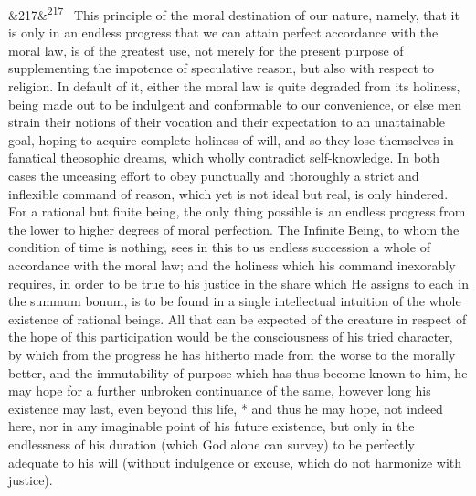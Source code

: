 \documentclass[12pt]{article}
\newcommand{\para}[1][]{\par\noindent\ifx&#1&\else\textsuperscript{\footnotesize #1}~\fi}
\begin{document}
\para[217] This principle of the moral destination of our nature, namely, that it is only in an endless progress that we can attain perfect accordance with the moral law, is of the greatest use, not merely for the present purpose of supplementing the impotence of speculative reason, but also with respect to religion. In default of it, either the moral law is quite degraded from its holiness, being made out to be indulgent and conformable to our convenience, or else men strain their notions of their vocation and their expectation to an unattainable goal, hoping to acquire complete holiness of will, and so they lose themselves in fanatical theosophic dreams, which wholly contradict self-knowledge. In both cases the unceasing effort to obey punctually and thoroughly a strict and inflexible command of reason, which yet is not ideal but real, is only hindered. For a rational but finite being, the only thing possible is an endless progress from the lower to higher degrees of moral perfection. The Infinite Being, to whom the condition of time is nothing, sees in this to us endless succession a whole of accordance with the moral law; and the holiness which his command inexorably requires, in order to be true to his justice in the share which He assigns to each in the summum bonum, is to be found in a single intellectual intuition of the whole existence of rational beings. All that can be expected of the creature in respect of the hope of this participation would be the consciousness of his tried character, by which from the progress he has hitherto made from the worse to the morally better, and the immutability of purpose which has thus become known to him, he may hope for a further unbroken continuance of the same, however long his existence may last, even beyond this life, * and thus he may hope, not indeed here, nor in any imaginable point of his future existence, but only in the endlessness of his duration (which God alone can survey) to be perfectly adequate to his will (without indulgence or excuse, which do not harmonize with justice).
\end{document}
